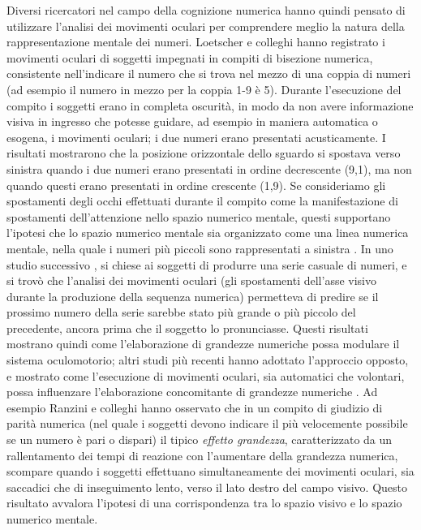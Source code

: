 \documentclass[12pt]{article}
\begin{document}
Diversi ricercatori nel campo della cognizione numerica hanno quindi pensato di utilizzare l'analisi dei movimenti oculari per comprendere meglio la natura della rappresentazione mentale dei numeri. Loetscher e colleghi \cite{Loetscher2008} hanno registrato i movimenti oculari di soggetti impegnati in compiti di bisezione numerica, consistente nell'indicare il numero che si trova nel mezzo di una coppia di numeri (ad esempio il numero in mezzo per la coppia 1-9 è 5). Durante l'esecuzione del compito i soggetti erano in completa oscurità, in modo da non avere informazione visiva in ingresso che potesse guidare, ad esempio in maniera automatica o esogena, i movimenti oculari; i due numeri erano presentati acusticamente. I risultati mostrarono che la posizione orizzontale dello sguardo si spostava verso sinistra quando i due numeri erano presentati in ordine decrescente (9,1), ma non quando questi erano presentati in ordine crescente (1,9). Se consideriamo gli spostamenti degli occhi effettuati durante il compito come la manifestazione di spostamenti dell'attenzione nello spazio numerico mentale, questi supportano l'ipotesi che lo spazio numerico mentale sia organizzato come una linea numerica mentale, nella quale i numeri più piccoli sono rappresentati a sinistra \cite{Zorzi2002}. In uno studio successivo \cite{Loetscher2010}, si chiese ai soggetti di produrre una serie casuale di numeri, e si trovò che l'analisi dei movimenti oculari (gli spostamenti dell'asse visivo durante la produzione della sequenza numerica) permetteva di predire se il prossimo numero della serie sarebbe stato più grande o più piccolo del precedente, ancora prima che il soggetto lo pronunciasse. Questi risultati mostrano quindi come l'elaborazione di grandezze numeriche possa modulare il sistema oculomotorio; altri studi più recenti hanno adottato l'approccio opposto, e mostrato come l'esecuzione di movimenti oculari, sia automatici che volontari, possa influenzare l'elaborazione concomitante di grandezze numeriche \cite{Ranzini2015,Ranzini2016}. Ad esempio Ranzini e colleghi \cite{Ranzini2016} hanno osservato che in un compito di giudizio di parità numerica (nel quale i soggetti devono indicare il più velocemente possibile se un numero è pari o dispari) il tipico \textit{effetto grandezza}, caratterizzato da un rallentamento dei tempi di reazione con l'aumentare della grandezza numerica, scompare quando i soggetti effettuano simultaneamente dei movimenti oculari, sia saccadici che di inseguimento lento, verso il lato destro del campo visivo. Questo risultato avvalora l'ipotesi di una corrispondenza tra lo spazio visivo e lo spazio numerico mentale.
\end{document}
